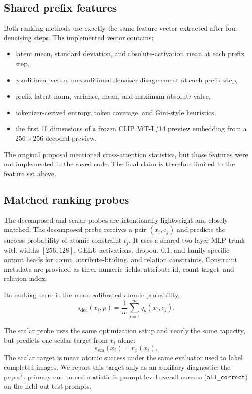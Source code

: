 \documentclass{article}
\begin{document}
\subsection{Shared prefix features}
Both ranking methods use exactly the same feature vector extracted after four denoising steps. The implemented vector contains:
\begin{itemize}
  \item latent mean, standard deviation, and absolute-activation mean at each prefix step,
  \item conditional-versus-unconditional denoiser disagreement at each prefix step,
  \item prefix latent norm, variance, mean, and maximum absolute value,
  \item tokenizer-derived entropy, token coverage, and Gini-style heuristics,
  \item the first 10 dimensions of a frozen CLIP ViT-L/14 preview embedding from a $256 \times 256$ decoded preview.
\end{itemize}
The original proposal mentioned cross-attention statistics, but those features were not implemented in the saved code. The final claim is therefore limited to the feature set above.

\subsection{Matched ranking probes}
The decomposed and scalar probes are intentionally lightweight and closely matched. The decomposed probe receives a pair $(x_i,c_j)$ and predicts the success probability of atomic constraint $c_j$. It uses a shared two-layer MLP trunk with widths $[256,128]$, GELU activations, dropout 0.1, and family-specific output heads for count, attribute-binding, and relation constraints. Constraint metadata are provided as three numeric fields: attribute id, count target, and relation index.

Its ranking score is the mean calibrated atomic probability,
\[
s_{\mathrm{dec}}(x_i,p)=\frac{1}{m}\sum_{j=1}^{m} q_\theta(x_i,c_j).
\]

The scalar probe uses the same optimization setup and nearly the same capacity, but predicts one scalar target from $x_i$ alone:
\[
s_{\mathrm{sca}}(x_i)=r_\phi(x_i).
\]
The scalar target is mean atomic success under the same evaluator used to label completed images. We report this target only as an auxiliary diagnostic; the paper's primary end-to-end statistic is prompt-level overall success (\texttt{all\_correct}) on the held-out test prompts.
\end{document}
